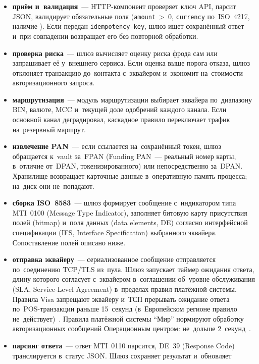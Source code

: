 \begin{itemize}
  \item \textbf{приём и~валидация}~--- HTTP-компонент проверяет ключ API, парсит
    JSON, валидирует обязательные поля (\texttt{amount}~>~0,
    \texttt{currency} по~ISO~4217, наличие \mbox{}). Если
    передан \texttt{idempotency-key}, шлюз ищет сохранённый ответ и~при
    совпадении возвращает его без повторной обработки.
  \item \textbf{проверка риска}~--- шлюз вычисляет оценку риска фрода сам или
    запрашивает её у~внешнего сервиса. Если оценка выше порога отказа,
    шлюз отклоняет транзакцию до~контакта с~эквайером и~экономит на~стоимости
    авторизационного запроса.
  \item \textbf{маршрутизация}~--- модуль маршрутизации выбирает эквайера
    по~диапазону BIN, валюте, MCC и~текущей доле одобрений каждого канала.
    Если основной канал деградировал, каскадное правило переключает трафик
    на~резервный маршрут.
  \item \textbf{извлечение PAN}~--- если \mbox{} ссылается
    на~сохранённый токен, шлюз обращается к~vault за~FPAN
    (Funding PAN~--- реальный номер карты, в~отличие от~DPAN,
    токенизированного) или непосредственно за~DPAN. Хранилище возвращает
    карточные данные в~оперативную память процесса; на~диск они не~попадают.
  \item \textbf{сборка ISO~8583}~--- шлюз формирует сообщение с~индикатором
    типа MTI~0100 (Message Type Indicator), заполняет битовую карту
    присутствия полей (bitmap) и~поля данных (data elements, DE) согласно
    интерфейсной спецификации (IFS, Interface Specification) выбранного
    эквайера. Сопоставление полей описано ниже.
  \item \textbf{отправка эквайеру}~--- сериализованное сообщение отправляется
    по~соединению TCP/TLS из~пула. Шлюз запускает таймер ожидания ответа,
    длину которого согласует с~эквайером в~соглашении об~уровне
    обслуживания (SLA, Service-Level Agreement) в~пределах правил
    платёжной системы. Правила Visa запрещают эквайеру и~ТСП прерывать
    ожидание ответа по~POS-транзакции раньше 15~секунд (в~Европейском
    регионе правило не~действует)~\cite{visa-core-rules}. Правила
    платёжной системы \enquote{Мир} нормируют обработку авторизационных
    сообщений Операционным центром: не~дольше 2~секунд~\cite{nspk-mir-rules}.
  \item \textbf{парсинг ответа}~--- ответ MTI~0110 парсится, DE~39 (Response
    Code) транслируется в~статус JSON. Шлюз сохраняет результат и~обновляет

\end{itemize}

